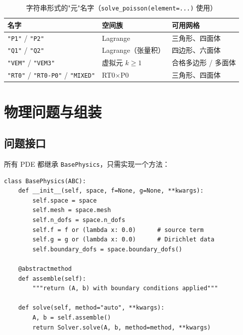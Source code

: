 \documentclass[UTF8,11pt,oneside]{ctexbook}
\theoremstyle{definition}
\theoremstyle{plain}
\newcommand{\code}[1]{\texttt{#1}}
\begin{document}
\begin{table}[htbp]
\centering
\caption{字符串形式的"元"名字（\code{solve\_poisson(element=...)} 使用）}
\label{tab:elem-names}
\begin{lrbox}{\guideTableBox}
\begin{tabular}{@{}L{3.6cm}L{3.6cm}L{6.2cm}@{}}
\toprule
名字 & 空间族 & 可用网格 \\
\midrule
\code{"P1"} / \code{"P2"} & Lagrange & 三角形、四面体 \\
\code{"Q1"} / \code{"Q2"} & Lagrange（张量积） & 四边形、六面体 \\
\code{"VEM"} / \code{"VEM3"} & 虚拟元 $k\ge1$ & 合格多边形 / 多面体 \\
\code{"RT0"} / \code{"RT0-P0"} / \code{"MIXED"} & RT0$\times$P0 & 三角形、四面体 \\
\bottomrule
\end{tabular}
\end{lrbox}%
\ifdim\wd\guideTableBox>\linewidth
  \resizebox{\linewidth}{!}{\usebox{\guideTableBox}}%
\else\usebox{\guideTableBox}\fi
\end{table}

\chapter{物理问题与组装}
\label{chap:physics}

\section{问题接口}

所有 PDE 都继承 \code{BasePhysics}，只需实现一个方法：

\begin{lstlisting}[language=MosicaFE,caption={示例 6.1：\code{BasePhysics} 接口},label={lst:basephysics}]
class BasePhysics(ABC):
    def __init__(self, space, f=None, g=None, **kwargs):
        self.space = space
        self.mesh = space.mesh
        self.n_dofs = space.n_dofs
        self.f = f or (lambda x: 0.0)      # source term
        self.g = g or (lambda x: 0.0)      # Dirichlet data
        self.boundary_dofs = space.boundary_dofs()

    @abstractmethod
    def assemble(self):
        """return (A, b) with boundary conditions applied"""

    def solve(self, method="auto", **kwargs):
        A, b = self.assemble()
        return Solver.solve(A, b, method=method, **kwargs)
\end{lstlisting}
\end{document}
